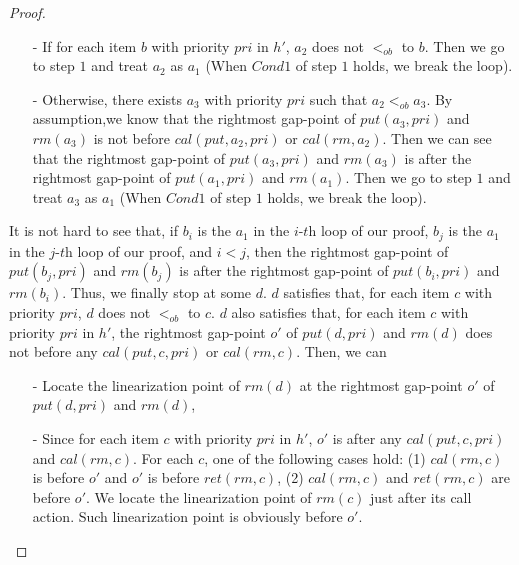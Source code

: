 \documentclass{llncs}
\begin{document}
\begin {proof}
\begin{itemize}
    \begin{itemize}
    \setlength{\itemsep}{0.5pt}
    \item[-] If for each item $b$ with priority $\textit{pri}$ in $h'$, $a_2$ does not $<_{\textit{ob}}$ to $b$. Then we go to step $1$ and treat $a_2$ as $a_1$ (When $\textit{Cond1}$ of step $1$ holds, we break the loop).
    \item[-] Otherwise, there exists $a_3$ with priority $\textit{pri}$ such that $a_2 <_{\textit{ob}} a_3$. By assumption,we know that the rightmost gap-point of $\textit{put}(a_3,\textit{pri})$ and $\textit{rm}(a_3)$ is not before $\textit{cal}(\textit{put},a_2,\textit{pri})$ or $\textit{cal}(\textit{rm},a_2)$. Then we can see that the rightmost gap-point of $\textit{put}(a_3,\textit{pri})$ and $\textit{rm}(a_3)$ is after the rightmost gap-point of $\textit{put}(a_1,\textit{pri})$ and $\textit{rm}(a_1)$. Then we go to step $1$ and treat $a_3$ as $a_1$ (When $\textit{Cond1}$ of step $1$ holds, we break the loop).
    \end{itemize}
\end{itemize}

It is not hard to see that, if $b_i$ is the $a_1$ in the $\textit{i-th}$ loop of our proof, $b_j$ is the $a_1$ in the $\textit{j-th}$ loop of our proof, and $i<j$, then the rightmost gap-point of $\textit{put}(b_j,\textit{pri})$ and $\textit{rm}(b_j)$ is after the rightmost gap-point of $\textit{put}(b_i,\textit{pri})$ and $\textit{rm}(b_i)$. Thus, we finally stop at some $d$. $d$ satisfies that, for each item $c$ with priority $\textit{pri}$, $d$ does not $<_{\textit{ob}}$ to $c$. $d$ also satisfies that, for each item $c$ with priority $\textit{pri}$ in $h'$, the rightmost gap-point $o'$ of $\textit{put}(d,\textit{pri})$ and $\textit{rm}(d)$ does not before any $\textit{cal}(\textit{put},c,\textit{pri})$ or $\textit{cal}(\textit{rm},c)$. Then, we can

\begin{itemize}
\setlength{\itemsep}{0.5pt}
\item[-] Locate the linearization point of $\textit{rm}(d)$ at the rightmost gap-point $o'$ of $\textit{put}(d,\textit{pri})$ and $\textit{rm}(d)$,

\item[-] Since for each item $c$ with priority $\textit{pri}$ in $h'$, $o'$ is after any $\textit{cal}(\textit{put},c,\textit{pri})$ and $\textit{cal}(\textit{rm},c)$. For each $c$, one of the following cases hold: (1) $\textit{cal}(\textit{rm},c)$ is before $o'$ and $o'$ is before $\textit{ret}(\textit{rm},c)$, (2) $\textit{cal}(\textit{rm},c)$ and $\textit{ret}(\textit{rm},c)$ are before $o'$. We locate the linearization point of $\textit{rm}(c)$ just after its call action. Such linearization point is obviously before $o'$.


\end{itemize}
\end{proof}
\end{document}
